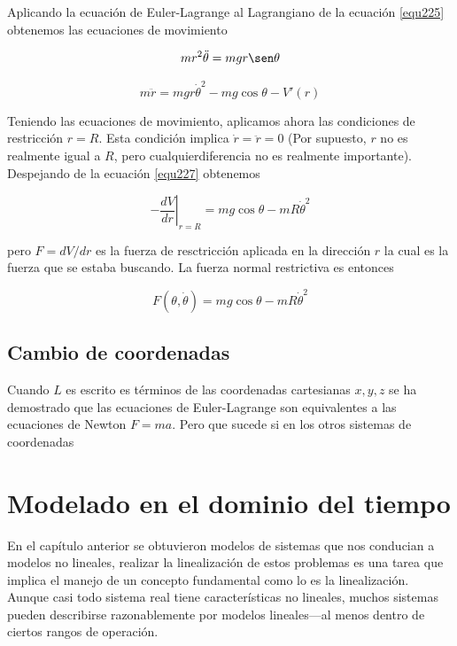 \documentclass[12pt]{book}
\theoremstyle{definition}
\theoremstyle{remark}
\theoremstyle{plain}
\begin{document}
Aplicando la ecuación de Euler-Lagrange al Lagrangiano de la ecuación \ref{equ225} obtenemos las ecuaciones de movimiento

\begin{equation}
\label{equ226}
m r^2 \ddot{\theta} = m g r \sen \theta
\end{equation}

\begin{equation}
\label{equ227}
m \ddot{r} = m g r \dot{\theta}^2-m g \cos \theta - V'(r)
\end{equation}

Teniendo las ecuaciones de movimiento, aplicamos ahora las condiciones de restricción $r=R$. Esta condición implica $\dot{r}= \ddot{r}=0$  (Por supuesto, $r$ no es realmente igual a $R$, pero cualquierdiferencia no es realmente importante). Despejando de la ecuación \ref{equ227} obtenemos

\begin{equation}
\label{equ228}
\left . - \frac{d V}{d r}  \right | _{r=R} = m g \cos \theta - m R \dot{\theta}^2
\end{equation}

pero $ F = dV / d r$ es la fuerza de resctricción aplicada en la dirección $r$ la cual es la fuerza que se estaba buscando. La fuerza normal restrictiva es entonces

\begin{equation}
\label{equ229}
F (\theta, \dot{\theta} )= m g \cos \theta - m R \dot{\theta}^2
\end{equation}

\section{Cambio de coordenadas}
Cuando $L$ es escrito es términos de las coordenadas cartesianas $x,y,z$  se ha demostrado que las ecuaciones de Euler-Lagrange son equivalentes a las ecuaciones de Newton $F=m a$. Pero que sucede si en los otros sistemas de coordenadas



\chapter{Modelado en el dominio del tiempo}
En el capítulo anterior se obtuvieron modelos de sistemas que nos conducian a modelos no lineales, realizar la linealización de estos problemas es una tarea que implica el manejo de un concepto fundamental como lo es la linealización. Aunque casi todo sistema real tiene características no lineales, muchos sistemas pueden describirse razonablemente por modelos lineales—al menos dentro de ciertos rangos de operación.
\end{document}
